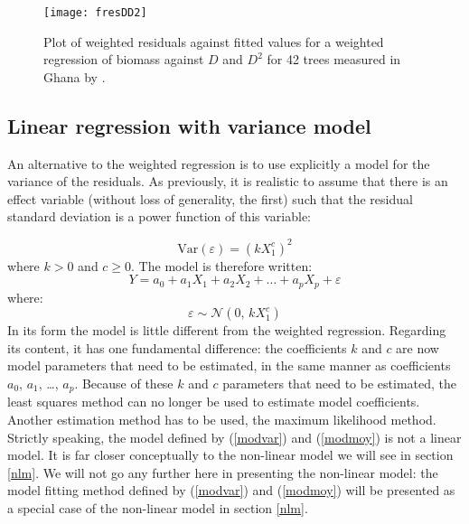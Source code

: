 \begin{figure}[htbp]
\begin{center}
\texttt{[image: fresDD2]}
\end{center}
\caption{Plot of weighted residuals against fitted values for a weighted regression of biomass against $D$ and $D^2$ for 42 trees measured in Ghana by \citet{henry10}.\label{fDD2res}}
\end{figure}

\subsection{Linear regression with variance model\label{lme}}

An alternative to the weighted regression is to use explicitly a model for the variance of the residuals. As previously, it is realistic to assume that there is an effect variable (without loss of generality, the first) such that the residual standard deviation is a power function of this variable:

\begin{equation}
\mathrm{Var}(\varepsilon)=(kX_1^c)^2\label{modvar}
\end{equation}
where $k>0$ and $c\geq0$. The model is therefore written:
\begin{equation}
Y=a_0+a_1X_1+a_2X_2+\ldots+a_pX_p+\varepsilon\label{modmoy}
\end{equation}
where:
\[
\varepsilon\sim\mathcal{N}(0,\,kX_1^c)
\]
In its form the model is little different from the weighted regression. Regarding its content, it has one fundamental difference: the coefficients $k$ and $c$ are now model parameters that need to be estimated, in the same manner as coefficients $a_0$, $a_1$, \ldots, $a_p$. Because of these $k$ and $c$ parameters that need to be estimated, the least squares method can no longer be used to estimate model coefficients. Another estimation method has to be used, the maximum likelihood method. Strictly speaking, the model defined by (\ref{modvar}) and (\ref{modmoy}) is not a linear model. It is far closer conceptually to the non-linear model we will see in section \ref{nlm}. We will not go any further here in presenting the non-linear model: the model fitting method defined by (\ref{modvar}) and (\ref{modmoy}) will be presented as a special case of the non-linear model in section \ref{nlm}.

